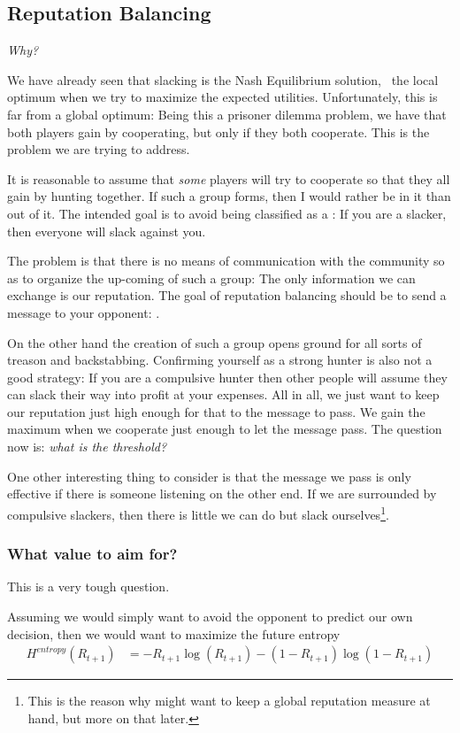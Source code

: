 \documentclass[10pt,fleqn]{article}
\begin{document}
\subsection{Reputation Balancing}
\emph{Why?}

We have already seen that slacking is the Nash Equilibrium solution, \ie\ the
local optimum when we try to maximize the expected utilities. Unfortunately,
this is far from a global optimum: Being this a prisoner dilemma problem, we
have that both players gain by cooperating, but only if they both cooperate.
This is the problem we are trying to address.

It is reasonable to assume that \emph{some} players will try to cooperate so
that they all gain by hunting together. If such a group forms, then I would
rather be in it than out of it. The intended goal is to avoid being classified
as a : If you are a slacker, then everyone will slack against you.

The problem is that there is no means of communication with the community so as
to organize the up-coming of such a group: The only information we can exchange
is our reputation. The goal of reputation balancing should be to send a message
to your opponent: .

On the other hand the creation of such a group opens ground for all sorts of
treason and backstabbing. Confirming yourself as a strong hunter is also not a
good strategy: If you are a compulsive hunter then other people will assume they
can slack their way into profit at your expenses. All in all, we just want to
keep our reputation just high enough for that to the message to pass. We gain
the maximum when we cooperate just enough to let the message pass. The question
now is: \emph{what is the threshold?}

One other interesting thing to consider is that the message we pass is only
effective if there is someone listening on the other end. If we are surrounded
by compulsive slackers, then there is little we can do but slack
ourselves\footnote{This is the reason why might want to keep a global reputation
measure at hand, but more on that later.}.

\subsubsection{What value to aim for?}

This is a very tough question.

Assuming we would simply want to avoid the opponent to predict our own
decision, then we would want to maximize the future entropy
\begin{align*}
  H^{entropy}(R_{t+1}) &= - R_{t+1} \log(R_{t+1}) - (1-R_{t+1}) \log(1-R_{t+1})
\end{align*}
\end{document}
